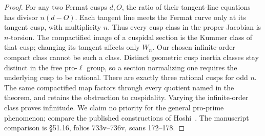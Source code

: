 \documentclass[11pt,oneside]{article}
\begin{document}
\begin{proof}
For any two Fermat cusps $d,O$, the ratio of
their tangent-line equations has divisor
$n(d-O)$. Each tangent line meets the Fermat
curve only at its tangent cusp, with
multiplicity $n$. Thus every cusp class in
the proper Jacobian is $n$-torsion.
The compactified image of a cuspidal section
is the Kummer class of that cusp; changing its
tangent affects only $W_n$. Our chosen
infinite-order compact class cannot be such
a class. Distinct geometric cusp inertia
classes stay distinct in the free pro-$\ell$
group, so a section normalizing one requires
the underlying cusp to be rational. There
are exactly three rational cusps for odd $n$.
The same compactified map factors through
every quotient named in the theorem, and
retains the obstruction to cuspidality.
Varying the infinite-order class proves
infinitude. We claim no priority for the
general pro-prime phenomenon; compare the
published constructions of Hoshi~\cite{Hoshi2010}.
The manuscript comparison is \S51.16,
folios 733v--736v, scans 172--178.
\end{proof}
\end{document}

